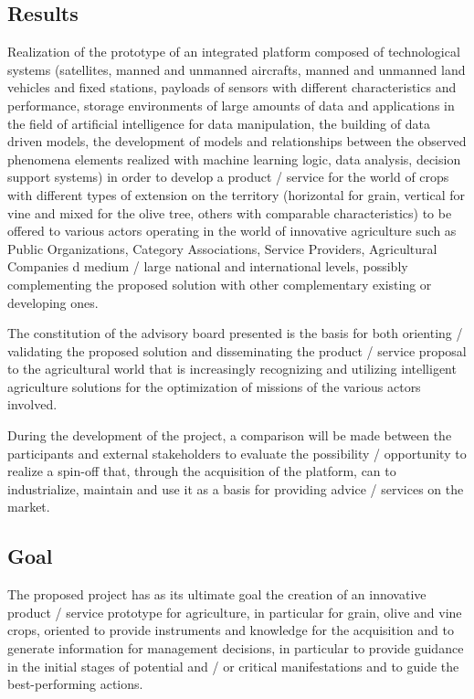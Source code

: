\documentclass[conference]{IEEEtran}
\begin{document}
\lipsum[2-4]

\subsection{Results}

Realization of the prototype of an integrated platform composed of technological systems (satellites, manned and unmanned aircrafts, manned and unmanned land vehicles and fixed stations, payloads of sensors with different characteristics and performance, storage environments of large amounts of data and applications in the field of artificial intelligence for data manipulation, the building of data driven models, the development of models and relationships between the observed phenomena elements realized with machine learning logic, data analysis, decision support systems) in order to develop a product / service for the world of crops with different types of extension on the territory (horizontal for grain, vertical for vine and mixed for the olive tree, others with comparable characteristics) to be offered to various actors operating in the world of innovative agriculture such as Public Organizations, Category Associations, Service Providers, Agricultural Companies d medium / large national and international levels, possibly complementing the proposed solution with other complementary existing or developing ones.

The constitution of the advisory board presented is the basis for both orienting / validating the proposed solution and disseminating the product / service proposal to the agricultural world that is increasingly recognizing and utilizing intelligent agriculture solutions for the optimization of missions of the various actors involved.

During the development of the project, a comparison will be made between the participants and external stakeholders to evaluate the possibility / opportunity to realize a spin-off that, through the acquisition of the platform, can to industrialize, maintain and use it as a basis for providing advice / services on the market.

\lipsum[2-4]

\subsection{Goal}

The proposed project has as its ultimate goal the creation of an innovative product / service prototype for agriculture, in particular for grain, olive and vine crops, oriented to provide instruments and knowledge for the acquisition and to generate information for management decisions, in particular to provide guidance in the initial stages of potential and / or critical manifestations and to guide the best-performing actions.
\end{document}
